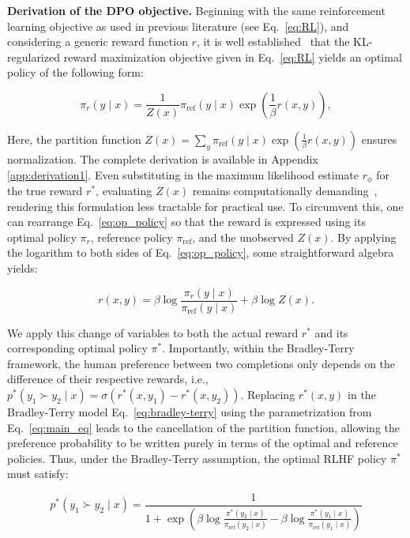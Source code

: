 \textbf{Derivation of the DPO objective.} Beginning with the same reinforcement learning objective as used in previous literature (see Eq.~\ref{eq:RL}), and considering a generic reward function $r$, it is well established~\citep{peters2007reinforcement, peng2019advantage, korbak2022reinforcement, go2023aligning} that the KL-regularized reward maximization objective given in Eq.~\ref{eq:RL} yields an optimal policy of the following form:

\begin{equation}\label{eq:op_policy}
    \pi_r(y\mid x) = \frac{1}{Z(x)}\pi_\text{ref}(y\mid x)\exp\left(\frac{1}{\beta}r(x, y)\right),
\end{equation}

Here, the partition function $Z(x) =\sum_{y}\pi_\text{ref}(y\mid x)\exp\left(\frac{1}{\beta}r(x, y)\right)$ ensures normalization. The complete derivation is available in Appendix \ref{app:derivation1}. Even substituting in the maximum likelihood estimate $r_\phi$ for the true reward $r^*$, evaluating $Z(x)$ remains computationally demanding~\citep{korbak2022reinforcement, go2023aligning}, rendering this formulation less tractable for practical use. To circumvent this, one can rearrange Eq.~\ref{eq:op_policy} so that the reward is expressed using its optimal policy $\pi_r$, reference policy $\pi_\text{ref}$, and the unobserved $Z(x)$. By applying the logarithm to both sides of Eq.~\ref{eq:op_policy}, some straightforward algebra yields:

\begin{equation}\label{eq:main_eq}
    r(x,y) =\beta \log \frac{\pi_r(y\mid x)}{\pi_\text{ref}(y\mid x)} + \beta \log Z(x).
\end{equation}

We apply this change of variables to both the actual reward $r^*$ and its corresponding optimal policy $\pi^*$. Importantly, within the Bradley-Terry framework, the human preference between two completions only depends on the difference of their respective rewards, i.e., ${p^*(y_1 \succ y_2 \mid x) = \sigma(r^*(x, y_1) - r^*(x, y_2))}$. Replacing $r^*(x, y)$ in the Bradley-Terry model Eq.~\ref{eq:bradley-terry} using the parametrization from Eq.~\ref{eq:main_eq} leads to the cancellation of the partition function, allowing the preference probability to be written purely in terms of the optimal and reference policies. Thus, under the Bradley-Terry assumption, the optimal RLHF policy $\pi^*$ must satisfy:

\begin{equation}\label{eq:objective}
    p^*(y_1\succ y_2 \mid x)=\frac{1}{1 + \exp\left(\beta \log \frac{\pi^*(y_2\mid x)}{\pi_\text{ref}(y_2\mid x)} - \beta \log \frac{\pi^*(y_1\mid x)}{\pi_\text{ref}(y_1\mid x)}\right)}
\end{equation}

